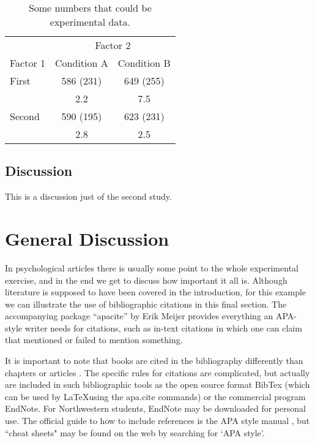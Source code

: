 \documentclass[doc]{apa}%
\begin{document}
\begin{table}[tbp]
\caption{Some numbers that could be experimental data.}
\label{tab:tab1}
\begin{tabular}{lcc}\hline
          & \multicolumn{2}{c}{Factor 2} \\ \cline{2-3}
Factor 1  & Condition A  & Condition B   \\ \hline
First     & 586 (231)    & 649 (255)     \\
          &    2.2       &    7.5        \\
Second    & 590 (195)    & 623 (231)     \\
          &    2.8       &    2.5        \\ \hline
\end{tabular}
\end{table}  



\subsection{Discussion} 
This is a discussion just of the second study.  

\section{General Discussion}
In psychological articles there is usually some point to the whole experimental exercise, and in the end we get to discuss how important it all is.  Although literature is supposed to have been covered in the introduction, for this example we can illustrate the use of bibliographic citations in this final section. The accompanying package ``apacite'' by Erik Meijer provides everything an APA-style writer needs for citations, such as in-text citations in which one can claim that \cite{leary} mentioned or failed to mention something. 

It is important to note that books \cite{leary} are cited in the bibliography differently than chapters \cite{rev:ea07} or articles \cite{killeen}.  The specific rules for citations are complicated, but actually  are included in such bibliographic tools as the open source format BibTex (which can be used by \LaTeX using the  apa.cite commands) or the commercial program EndNote.  For Northwestern students, EndNote may be downloaded for personal use.  The official guide to how to include references is the APA style manual \cite{apa}, but ``cheat sheets" may be found on the web by searching for `APA style'. 
\end{document}
